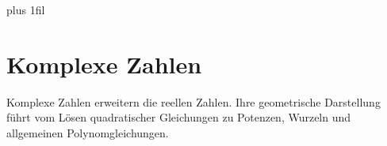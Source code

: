 \begingroup
\leftskip=0pt
\rightskip=0pt
\parfillskip=0pt plus 1fil
\chapter{Komplexe Zahlen}
\label{chap:complex_numbers}

Komplexe Zahlen erweitern die reellen Zahlen. Ihre geometrische Darstellung
führt vom Lösen quadratischer Gleichungen zu Potenzen, Wurzeln und
allgemeinen Polynomgleichungen.


\clearpage

\clearpage

\clearpage

\clearpage

\clearpage

\par\endgroup
